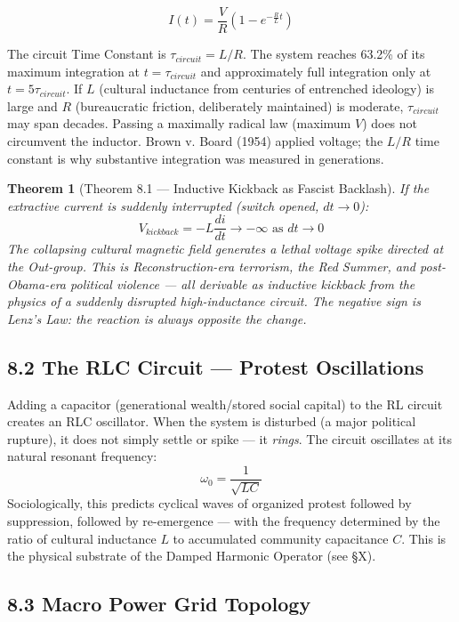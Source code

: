 \documentclass[12pt]{book}
\numberwithin{equation}{chapter}
\newtheorem{theorem}{Theorem}[chapter]
\begin{document}
\begin{equation}
      \boxed{I(t) = \frac{V}{R}\left(1 - e^{-\frac{R}{L}t}\right)}
\label{eq:UEF-3:_Progressive_Reform_Current}
\end{equation}

    The circuit Time Constant is $\tau_{circuit} = L/R$. The system reaches 63.2\% of its maximum integration at $t = \tau_{circuit}$ and approximately full integration only at $t = 5\tau_{circuit}$. If $L$ (cultural inductance from centuries of entrenched ideology) is large and $R$ (bureaucratic friction, deliberately maintained) is moderate, $\tau_{circuit}$ may span decades. Passing a maximally radical law (maximum $V$) does not circumvent the inductor. Brown v. Board (1954) applied voltage; the $L/R$ time constant is why substantive integration was measured in generations.
  

\begin{theorem}[Theorem 8.1 — Inductive Kickback as Fascist Backlash]
If the extractive current is suddenly interrupted (switch opened, $dt \to 0$):
      \[ V_{kickback} = -L\frac{di}{dt} \to -\infty \text{ as } dt \to 0 \]
    The collapsing cultural magnetic field generates a lethal voltage spike directed at the Out-group. This is Reconstruction-era terrorism, the Red Summer, and post-Obama-era political violence — all derivable as inductive kickback from the physics of a suddenly disrupted high-inductance circuit. The negative sign is Lenz's Law: the reaction is always opposite the change.
  \end{theorem}

\subsection{8.2 The RLC Circuit — Protest Oscillations}

    Adding a capacitor (generational wealth/stored social capital) to the RL circuit creates an RLC oscillator. When the system is disturbed (a major political rupture), it does not simply settle or spike — it \emph{rings}. The circuit oscillates at its natural resonant frequency:
    \[
      \omega_0 = \frac{1}{\sqrt{LC}}
    \]
    Sociologically, this predicts cyclical waves of organized protest followed by suppression, followed by re-emergence — with the frequency determined by the ratio of cultural inductance $L$ to accumulated community capacitance $C$. This is the physical substrate of the Damped Harmonic Operator (see §X).
  

\subsection{8.3 Macro Power Grid Topology}
\end{document}
